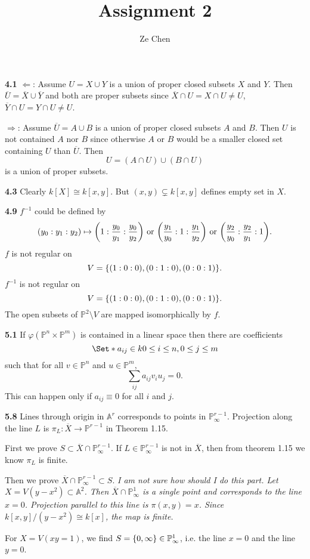 \documentclass{article}
\title{Assignment 2}
\author{Ze Chen}
\makeatletter
\newcommand*{\shifttext}[1]{%
  \settowidth{\@tempdima}{#1}%
  \hspace{-\@tempdima}#1%
}
\newcommand{\plabel}[1]{%
\shifttext{\textbf{#1}\quad}%
}
\newcommand{\prule}{%
\begin{center}%
\hdashrule[0.5ex]{.99\linewidth}{1pt}{1pt 2.5pt}%
\end{center}%
}
\makeatother
\begin{document}
\maketitle

\plabel{4.1}%
$\Leftarrow$:
Assume $U = X \cup Y$ is a union of proper closed subsets $X$ and $Y$.
Then $\overline{U} = \overline{X} \cup \overline{Y}$ and both are proper subsets since $\overline{X} \cap U = X\cap U \neq U$, $\overline{Y} \cap U = Y \cap U \neq U$.
\par
$\Rightarrow$:
Assume $\overline{U} = A \cup B$ is a union of proper closed subsets $A$ and $B$.
Then $U$ is not contained $A$ nor $B$ since otherwise $A$ or $B$ would be a smaller closed set containing $U$ than $\overline{U}$.
Then
\[ U = (A\cap U) \cup (B\cap U) \]
is a union of proper subsets.

\plabel{4.3}%
Clearly $k[X] \cong k[x,y]$.
But $(x,y) \subsetneq k[x,y]$ defines empty set in $X$.

\plabel{4.9}%
$f^{-1}$ could be defined by
\[ (y_0:y_1:y_2) \mapsto \qty(1:\frac{y_0}{y_1}:\frac{y_0}{y_2}) \text{ or } \qty(\frac{y_1}{y_0}:1:\frac{y_1}{y_2}) \text{ or } \qty(\frac{y_2}{y_0}:\frac{y_2}{y_1}:1). \]
$f$ is not regular on
\[ V = \qty{(1:0:0), (0:1:0), (0:0:1)}. \]
$f^{-1}$ is not regular on
\[ V = \qty{(1:0:0), (0:1:0), (0:0:1)}. \]
The open subsets of $\mathbb{P}^2\setminus V$ are mapped isomorphically by $f$.

\prule

\plabel{5.1}%
If $\varphi(\mathbb{P}^n \times \mathbb{P}^m)$ is contained in a linear space then there are coefficients
\[ \Set*{a_{ij}\in k}{0\le i\le n, 0\le j \le m} \]
such that for all $v\in \mathbb{P}^n$ and $u\in \mathbb{P}^m$,
\[ \sum_{ij} a_{ij} v_i u_j = 0. \]
This can happen only if $a_{ij} \equiv 0$ for all $i$ and $j$.

\plabel{5.8}%
Lines through origin in $\mathbb{A}^r$ corresponds to points in $\mathbb{P}^{r-1}_\infty$.
Projection along the line $L$ is $\pi_L: \overline{X} \rightarrow \mathbb{P}^{r-1}$ in Theorem 1.15.
\par
First we prove $S \subset \overline{X} \cap \mathbb{P}^{r-1}_\infty$.
If $L\in \mathbb{P}^{r-1}_\infty$ is not in $\overline{X}$, then from theorem 1.15 we know $\pi_L$ is finite.
\par
Then we prove $\overline{X} \cap \mathbb{P}^{r-1}_\infty \subset S$.
\textit{%
I am not sure how should I do this part.
Let $X = V(y-x^2) \subset \mathbb{A}^2$.
Then $\overline{X} \cap \mathbb{P}^1_\infty$ is a single point and corresponds to the line $x=0$.
Projection parallel to this line is $\pi(x,y) = x$.
Since $k[x,y]/(y-x^2) \cong k[x]$, the map is finite.
}
\par
For $X = V(xy = 1)$, we find $S = \qty{0,\infty} \in \mathbb{P}^1_\infty$, i.e. the line $x=0$ and the line $y=0$.
\end{document}
